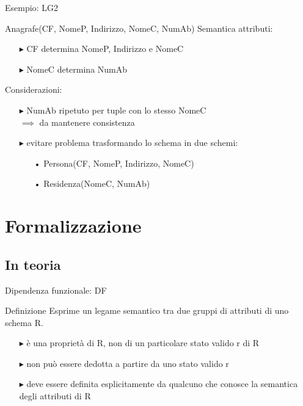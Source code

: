 \documentclass{beamer}
\begin{document}
\begin{frame}{Esempio: LG2}

    \Large Anagrafe(CF, NomeP, Indirizzo, NomeC, NumAb)
    \vfill
    \normalsize Semantica attributi:
    \begin{itemize}
        \item[$\blacktriangleright$] CF determina NomeP, Indirizzo e NomeC
        \item[$\blacktriangleright$] NomeC determina NumAb
    \end{itemize}
    \vfill
    Considerazioni:
    \begin{itemize}
        \item[$\blacktriangleright$] NumAb ripetuto per tuple con lo stesso NomeC \\ $\implies$ da mantenere consistenza
        \item[$\blacktriangleright$] evitare problema trasformando lo schema in due schemi:
            \begin{itemize}
                \item[•] Persona(CF, NomeP, Indirizzo, NomeC)
                \item[•] Residenza(NomeC, NumAb)
            \end{itemize}
    \end{itemize}

\end{frame}

\section{Formalizzazione}

\subsection{In teoria}
\begin{frame}{Dipendenza funzionale: DF}

\begin{block}{Definizione}
Esprime un legame semantico tra due gruppi di attributi di uno schema R.
\end{block}
    \begin{itemize}
        \item[$\blacktriangleright$] è una proprietà di R, non di un particolare stato valido r di R
        \item[$\blacktriangleright$] non può essere dedotta a partire da uno stato valido r
        \item[$\blacktriangleright$] deve essere definita esplicitamente da qualcuno che conosce la semantica degli attributi di R
    \end{itemize}
\end{frame}
\end{document}
